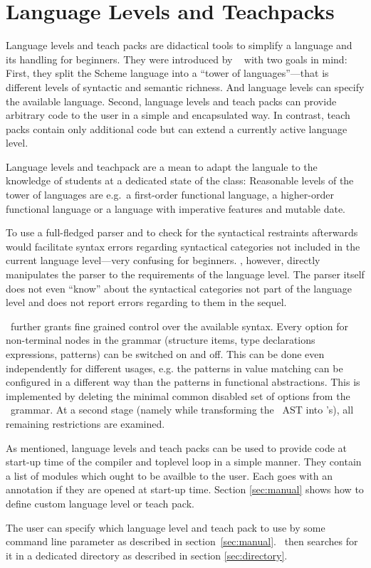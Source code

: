 
\section{Language Levels and Teachpacks}
\label{sec:teachpacks}

Language levels and teach packs are didactical tools to simplify a language and
its handling for beginners. They were introduced by \drscheme\
\citep{Felleisen98thedrscheme}  with two goals in mind:
First, they split the Scheme language into a ``tower of languages''---that is
different levels of syntactic and semantic richness.
And language levels can specify the available language.
Second, language levels and teach packs can provide arbitrary code to
the user in a simple and encapsulated way. In contrast, teach packs contain only
additional code but can extend a currently active language level.

Language levels and teachpack are a mean to adapt the languale to the
knowledge of students at a dedicated state of the class: Reasonable levels of
the tower of languages are e.g.\ a first-order functional language, a
higher-order functional language or a language with imperative features and
mutable date.

To use a full-fledged parser and to check for the syntactical restraints afterwards
would facilitate syntax errors regarding syntactical categories not included in
the current language level---very confusing for beginners. 
\easyocaml, however, directly manipulates the parser to the requirements of the
language level.
The parser itself does not even ``know'' about the syntactical
categories not part of the language level and  does not report errors regarding
to them in the sequel.

\easyocaml\ further grants fine grained control over the available syntax.
Every option for non-terminal nodes in the grammar (structure items, type
declarations  expressions, patterns) can be switched on and off. This can be
done even independently for different usages, e.g. the patterns in value
matching\ttfootnote{match \dots\ with \emph{pat} -> \dots} can be configured in
a different way than the patterns in functional abstractions.
This is implemented by
deleting the minimal common disabled set of options from the \camlpf\ grammar.
At a second stage (namely while transforming the \ocaml\ AST into
\easyocaml's), all remaining restrictions are examined.

As mentioned, language levels and teach packs can be used to provide code at
start-up time of the compiler and toplevel loop in a simple manner. They contain
a list of modules which ought to be availble to the user. Each goes with an
annotation if they are opened at start-up time.
Section \ref{sec:manual} shows how to define custom language level or teach
pack.

The user can specify which language level and teach pack to use by some command
line parameter as described in section~\ref{sec:manual}.
\easyocaml\ then searches for it in a dedicated directory as described in
section \ref{sec:directory}.


